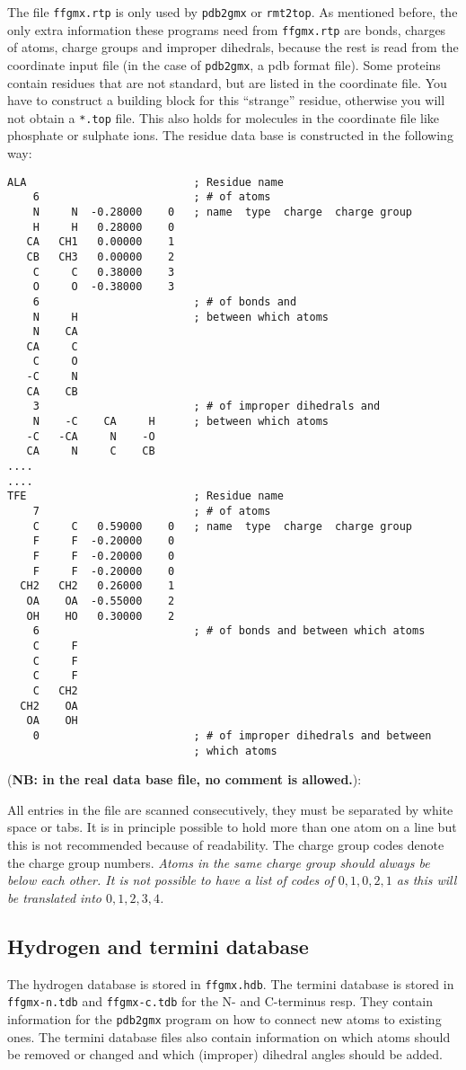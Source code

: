 The file {\tt ffgmx.rtp} is only used by \verb'pdb2gmx' or
\verb'rmt2top'. As mentioned before, the only extra information these
programs need from {\tt ffgmx.rtp} are bonds, charges of atoms,
charge groups and improper dihedrals, because the rest is read from
the coordinate input file (in the case of \verb'pdb2gmx', a pdb format
file). Some proteins contain residues that are not standard, but are
listed in the coordinate file. You have to construct a building block
for this ``strange'' residue, otherwise you will not obtain a
\verb'*.top' file. This also holds for molecules in the
coordinate file like phosphate or sulphate ions.
The residue data base is constructed in the following way:
{\small\begin{verbatim}
ALA                          ; Residue name
    6                        ; # of atoms
    N     N  -0.28000    0   ; name  type  charge  charge group
    H     H   0.28000    0
   CA   CH1   0.00000    1
   CB   CH3   0.00000    2
    C     C   0.38000    3
    O     O  -0.38000    3
    6                        ; # of bonds and 
    N     H                  ; between which atoms
    N    CA
   CA     C
    C     O
   -C     N
   CA    CB
    3                        ; # of improper dihedrals and
    N    -C    CA     H      ; between which atoms 
   -C   -CA     N    -O
   CA     N     C    CB
....
....
TFE                          ; Residue name  
    7                        ; # of atoms
    C     C   0.59000    0   ; name  type  charge  charge group
    F     F  -0.20000    0
    F     F  -0.20000    0
    F     F  -0.20000    0
  CH2   CH2   0.26000    1
   OA    OA  -0.55000    2
   OH    HO   0.30000    2
    6                        ; # of bonds and between which atoms
    C     F
    C     F
    C     F
    C   CH2
  CH2    OA
   OA    OH
    0                        ; # of improper dihedrals and between 
                             ; which atoms
\end{verbatim}}
({\bf NB: in the real data base file, no comment is allowed.}):

All entries in the file are scanned consecutively, they must be separated by
white space or tabs. It is in principle possible to hold more than one atom on
a line but this is not recommended because of readability. The charge group 
codes denote the charge group numbers. {\em Atoms in the same charge group
should always be below each other. It is not possible to have a 
list of codes of $0, 1, 0, 2, 1$ as this will be translated into
$0, 1, 2, 3, 4$.} 

\subsection{Hydrogen and termini database}
The hydrogen database is stored in {\tt ffgmx.hdb}. The termini
database is stored in {\tt ffgmx-n.tdb} and {\tt ffgmx-c.tdb} for the
N- and C-terminus resp. They contain information for the {\tt pdb2gmx}
program on how to connect new atoms to existing ones. The termini
database files also contain information on which atoms should be
removed or changed and which (improper) dihedral angles should be
added.

